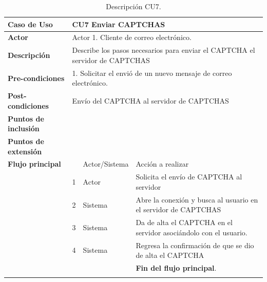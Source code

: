 \begin{longtable}[H]{| p{} | p{} |p{4cm}|p{5cm}|}
     \hline
     \textbf{Caso de Uso} &\multicolumn{3}{|l|}{CU7 Enviar CAPTCHAS}\\
     \hline
     \textbf{Actor} & \multicolumn{3}{|l|}{Actor 1. Cliente de correo electrónico.}\\
     \hline
     \textbf{Descripción} & \multicolumn{3}{|p{10cm}|}{Describe los pasos necesarios para enviar el CAPTCHA el servidor de CAPTCHAS}\\
     \hline
     \textbf{Pre-condiciones} & \multicolumn{3}{|l|}{1. Solicitar el envió de un nuevo mensaje de correo electrónico.}\\
     \hline
     \textbf{Post-condiciones} & \multicolumn{3}{|l|}{Envío del CAPTCHA al servidor de CAPTCHAS}\\
     \hline
     \textbf{Puntos de inclusión} & \multicolumn{3}{|l|}{}\\
     \hline
     \textbf{Puntos de extensión} & \multicolumn{3}{|l|}{}\\
     \hline
     \textbf{Flujo principal} & & Actor/Sistema & Acción a realizar\\
     \hline
     & 1 & Actor & Solicita el envío de CAPTCHA al servidor\\
     \hline
     & 2 & Sistema & Abre la conexión y busca al usuario en el servidor de CAPTCHAS\\
     \hline
     & 3 & Sistema & Da de alta el CAPTCHA en el servidor asociándolo con el usuario.\\
     \hline
     & 4 & Sistema & Regresa la confirmación de que se dio de alta el CAPTCHA\\
     \hline
     & & & \textbf{Fin del flujo principal}.\\
     \hline
    \caption{Descripción CU7.}
    \label{tabla:CU7}
\end{longtable}


\pagebreak
